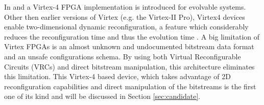 \label{sec:virtex4}

In \cite{virtex4} and \cite{PDR} a Virtex-4 FPGA implementation is introduced for evolvable systems. Other then earlier versions of Virtex (e.g. the Virtex-II Pro), Virtex4 devices enable two-dimensional dynamic reconfiguration, a feature which considerably reduces the reconfiguration time and thus the evolution time \cite{virtex4}. A big limitation of Virtex FPGAs is an almost unknown and undocumented bitstream data format and an unsafe configurations schema. By using both Virtual Reconfigurable Circuits (VRCs) and direct bitstream manipulation, this architecture eliminates this limitation. This Virtex-4 based device, which takes advantage of 2D reconfiguration capabilities and direct manipulation of the bitstreams is the first one of its kind and will be discussed in Section \ref{sec:candidate}.